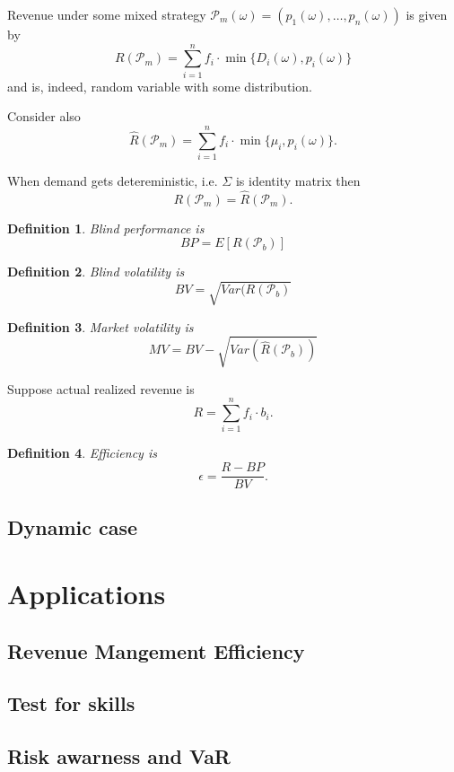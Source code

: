 \documentclass[a4paper,oneside]{article}
\newtheorem{defi}{Definition}
\begin{document}
  Revenue under some mixed strategy $\mathcal{P}_m(\omega) = (p_1(\omega),\ldots,p_n(\omega))$ is given by
  $$
  R(\mathcal{P}_m) = \sum_{i=1}^n f_i \cdot \min\{ D_i(\omega), p_i(\omega) \}
  $$
  and is, indeed, random variable with some distribution.

  Consider also
  $$
  \hat{R}(\mathcal{P}_m) = \sum_{i=1}^n f_i \cdot \min\{ \mu_i, p_i(\omega) \}.
  $$

  When demand gets detereministic, i.e. $\Sigma$ is identity matrix then
  $$
  R(\mathcal{P}_m) = \hat{R}(\mathcal{P}_m).
  $$

  \begin{defi}
  Blind performance is
  $$
  BP = E[R(\mathcal{P}_b)]
  $$ 
  \end{defi}

  \begin{defi}
  Blind volatility is
  $$
  BV = \sqrt{Var(R(\mathcal{P}_b)}
  $$
  \end{defi}

  \begin{defi}
  Market volatility is
  $$
  MV = BV - \sqrt{Var(\hat{R}(\mathcal{P}_b))}
  $$
  \end{defi}

  Suppose actual realized revenue is
  $$
  R = \sum_{i=1}^n f_i \cdot b_i.
  $$
  
  \begin{defi}
  Efficiency is
  $$
  \epsilon = \frac{R - BP}{BV}.
  $$ 
  \end{defi}

    \subsection{Dynamic case}

  \section{Applications}
    \subsection{Revenue Mangement Efficiency}
    \subsection{Test for skills}
    \subsection{Risk awarness and VaR}  
\end{document}
